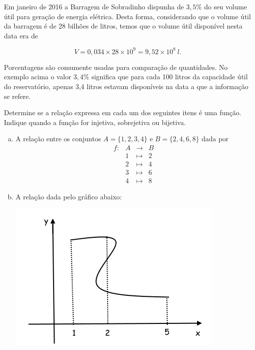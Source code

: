 \begin{exemplo} Em janeiro de 2016 a Barragem de Sobradinho dispunha de $3,5\%$ do seu volume útil para geração de energia elétrica.
Desta forma, considerando que o volume útil da barragem é de 28 bilhões de litros, temos que o volume útil disponível nesta data era de

$$V=0,034\times28\times10^9=9,52\times10^8 \ l.$$
\end{exemplo}

Porcentagens são comumente usadas para comparação de quantidades.  No exemplo acima o valor $3,4\%$ significa que
para cada 100 litros da capacidade útil do reservatório, apenas 3,4 litros estavam disponíveis na data a que a informação se refere.

\begin{secaoexercicio}

\begin{xca} Determine se a relação expressa em cada um dos seguintes itens é uma função. Indique quando a função for injetiva, sobrejetiva ou bijetiva.

\begin{enumerate}[(a)]
\item A relação entre os conjuntos $A=\{1,2,3,4\}$ e $B=\{2,4,6,8\}$ dada por
$$\begin{array}{crcl}
f:&A&\rightarrow&B\\
&1&\mapsto&2\\
&2&\mapsto&4\\
&3&\mapsto&6\\
&4&\mapsto&8
\end{array}$$

\item A relação dada pelo gráfico abaixo:

\begin{center}
\includegraphics[scale=0.8]{./chapters/preliminares/imgs/naofuncao}
\end{center}


\end{enumerate}
\end{xca}
\end{secaoexercicio}
